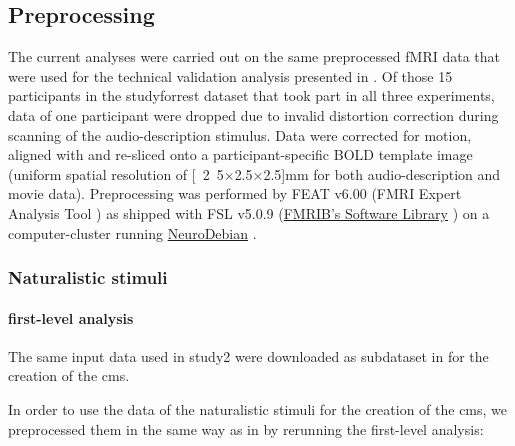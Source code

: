 \subsection{Preprocessing}


The current analyses were carried out on the same preprocessed fMRI data
\citep{hanke2016aligned} that were used for the technical validation analysis
presented in \citet{hanke2016simultaneous}.
Of those 15 participants in the studyforrest dataset that took part in all three
experiments, data of one participant were dropped due to invalid distortion
correction during scanning of the audio-description stimulus.
Data were corrected for motion, aligned with and re-sliced onto a
participant-specific BOLD template image \citep{sengupta2016extension} (uniform
spatial resolution of \unit[2.5$\times$2.5$\times$2.5]{mm} for both
audio-description and movie data).
Preprocessing was performed by FEAT v6.00 (FMRI Expert Analysis Tool
\citep{woolrich2001autocorr}) as shipped with FSL v5.0.9
(\href{https://www.fmrib.ox.ac.uk/fsl}{FMRIB's Software Library}
\citep{smith2004fsl}) on a computer-cluster running
\href{http://neuro.debian.net}{NeuroDebian} \citep{halchenko2012open}.



\subsubsection{Naturalistic stimuli}



\paragraph{first-level analysis}


The same input data used in study2 were downloaded as subdataset in
\citep{haeusler2021ppadata} for the creation of the \ac{cms}.

%
In order to use the data of the naturalistic stimuli for the creation of the
\ac{cms}, we preprocessed them in the same way as in
\citep{haeusler2022processing} by rerunning the first-level analysis:

